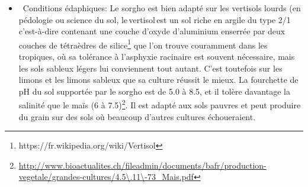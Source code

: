 \documentclass[a4paper,11pt]{article}
\begin{document}
\begin{itemize}
 
 \item~Conditions édaphiques:
  Le sorgho est bien adapté sur les vertisols lourds (en pédologie ou science du sol,
 le\,vertisol\,est un sol riche en argile du type 2/1 c’est-à-dire
 contenant une couche d’oxyde d’aluminium enserrée par deux couches de
 tétraèdres de
 silice\footnote{https://fr.wikipedia.org/wiki/Vertisol} que l’on
 trouve couramment dans les tropiques, où sa tolérance à l’asphyxie
 racinaire est souvent nécessaire, mais les sols sableux légers lui 
conviennent tout autant. C’est toutefois sur les limons et les limons
 sableux que sa culture réussit le mieux. La fourchette de pH du sol
 supportée par le sorgho est de 5.0 à 8.5, et il tolère davantage la
 salinité que le maïs (6 à
 7.5)\footnote{\url{http://www.bioactualites.ch/fileadmin/documents/bafr/production-vegetale/grandes-cultures/4.5\.11\-73_Mais.pdf}}. Il est adapté aux sols pauvres et peut produire du grain sur des sols où beaucoup d’autres cultures échoueraient.
 
 \end{itemize}
 
\end{document}
